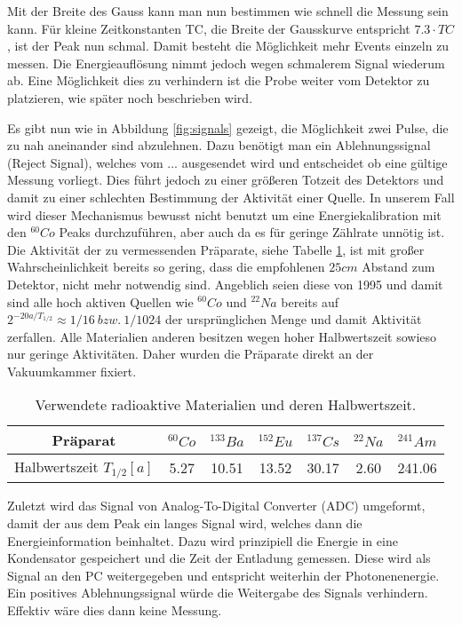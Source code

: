 \documentclass[]{article}
\begin{document}
Mit der Breite des Gauss kann man nun bestimmen wie schnell die Messung sein kann. Für kleine Zeitkonstanten TC, die Breite der Gausskurve entspricht $7.3\cdot TC$ \cite{signalverarbeitung}, ist der Peak nun schmal. Damit besteht die Möglichkeit mehr Events einzeln zu messen. Die Energieauflösung nimmt jedoch wegen schmalerem Signal wiederum ab. Eine Möglichkeit dies zu verhindern ist die Probe weiter vom Detektor zu platzieren, wie später noch beschrieben wird.

Es gibt nun wie in Abbildung \ref{fig:signals} gezeigt, die Möglichkeit zwei Pulse, die zu nah aneinander sind abzulehnen. Dazu benötigt man ein Ablehnungssignal (Reject Signal), welches vom ... ausgesendet wird und entscheidet ob eine gültige Messung vorliegt. Dies führt jedoch zu einer größeren Totzeit des Detektors und damit zu einer schlechten Bestimmung der Aktivität einer Quelle. In unserem Fall wird dieser Mechanismus bewusst nicht benutzt um eine Energiekalibration mit den $^{60}Co$ Peaks durchzuführen, aber auch da es für geringe Zählrate unnötig ist.  
Die Aktivität der zu vermessenden Präparate, siehe Tabelle \ref{tab:T 1/2}, ist mit großer Wahrscheinlichkeit bereits so gering, dass die empfohlenen $25cm$ Abstand zum Detektor, nicht mehr notwendig sind. Angeblich seien diese von 1995 und damit sind alle hoch aktiven Quellen wie $^{60}Co$ und $^{22}Na$ bereits auf $2^{-20a/T_{1/2}} \approx 1/16 \ bzw. \ 1/1024 $ der ursprünglichen Menge und damit Aktivität zerfallen. Alle Materialien anderen besitzen wegen hoher Halbwertszeit sowieso nur geringe Aktivitäten. 
Daher wurden die Präparate direkt an der Vakuumkammer fixiert.

\begin{table}[H]
\centering
\begin{tabular}{c|c|c|c|c|c|c}
Präparat & $^{60}Co$& $^{133}Ba$& $^{152}Eu$& $^{137}Cs$& $^{22}Na$ & $^{241}Am$ \\ \hline 
Halbwertszeit $T_{1/2} [a]$ & 5.27 & 10.51 & 13.52 & 30.17 & 2.60 & 241.06  \\ 
\end{tabular}
\caption{Verwendete radioaktive Materialien und deren Halbwertszeit.}
\label{tab:T 1/2}
\end{table}

Zuletzt wird das Signal von Analog-To-Digital Converter (ADC) umgeformt, damit der aus dem Peak ein langes Signal wird, welches dann die Energieinformation beinhaltet. Dazu wird prinzipiell die Energie in eine Kondensator gespeichert und die Zeit der Entladung gemessen. Diese wird als Signal an den PC weitergegeben und entspricht weiterhin der Photonenenergie. Ein positives Ablehnungssignal würde die Weitergabe des Signals verhindern. Effektiv wäre dies dann keine Messung.
\end{document}

